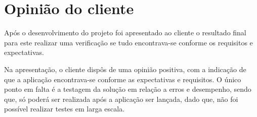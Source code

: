 \section{Opinião do cliente}

Após o desenvolvimento do projeto foi apresentado ao cliente o resultado final para este realizar uma verificação se tudo encontrava-se conforme os requisitos e expectativas.

 Na apresentação, o cliente dispôs de uma opinião positiva, com a indicação de que a aplicação encontrava-se conforme as expectativas e requisitos. O único ponto em falta é a testagem da solução em relação a erros e desempenho, sendo que, só poderá ser realizada após a aplicação ser lançada, dado que, não foi possível realizar testes em larga escala.